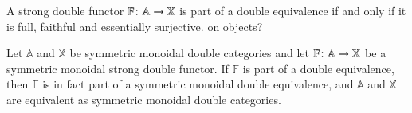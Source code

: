 \documentclass[reqno]{amsart}
\begin{document}
\begin{thm}\label{ShulDubEquiv}
A strong double functor $\mathbb{F} \colon \mathbb{A} \to \mathbb{X}$ is part of a double equivalence if and only if it is full, faithful and essentially surjective. {\chris on objects?}
\end{thm}

\begin{prop}
Let $\mathbb{A}$ and $\mathbb{X}$ be symmetric monoidal double categories and let $\mathbb{F} \colon \mathbb{A} \to \mathbb{X}$ be a symmetric monoidal strong double functor. If $\mathbb{F}$ is part of a double equivalence, then $\mathbb{F}$ is in fact part of a symmetric monoidal double equivalence, and $\mathbb{A}$ and $\mathbb{X}$ are equivalent as symmetric monoidal double categories.
\end{prop}
\end{document}
